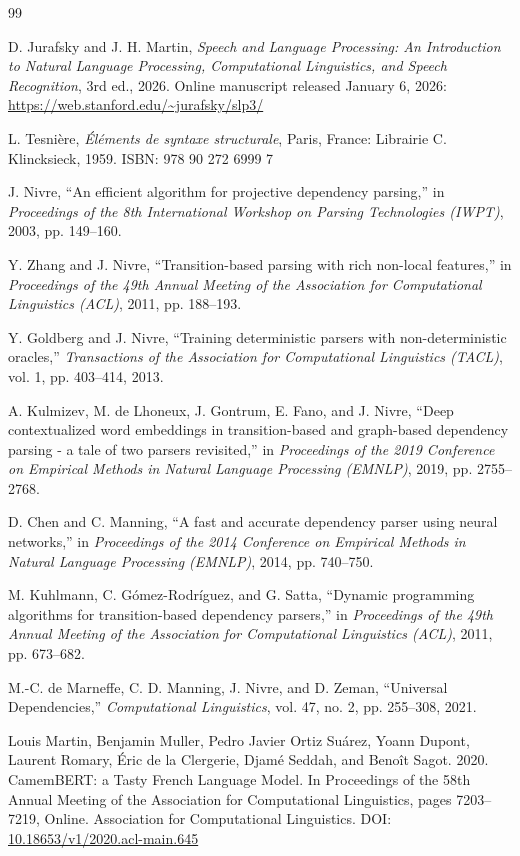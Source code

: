 \documentclass[12pt,a4paper]{article}
\begin{document}
\clearpage
\begin{thebibliography}{99}

D. Jurafsky and J. H. Martin, \emph{Speech and Language Processing: An Introduction to Natural Language Processing, Computational Linguistics, and Speech Recognition}, 3rd ed., 2026. Online manuscript released January 6, 2026: \url{https://web.stanford.edu/~jurafsky/slp3/}

L. Tesnière, \emph{Éléments de syntaxe structurale}, Paris, France: Librairie C. Klincksieck, 1959. ISBN: 978 90 272 6999 7

J. Nivre, ``An efficient algorithm for projective dependency parsing,'' in \emph{Proceedings of the 8th International Workshop on Parsing Technologies (IWPT)}, 2003, pp. 149--160.

Y. Zhang and J. Nivre, ``Transition-based parsing with rich non-local features,'' in \emph{Proceedings of the 49th Annual Meeting of the Association for Computational Linguistics (ACL)}, 2011, pp. 188--193.

Y. Goldberg and J. Nivre, ``Training deterministic parsers with non-deterministic oracles,'' \emph{Transactions of the Association for Computational Linguistics (TACL)}, vol. 1, pp. 403--414, 2013.

A. Kulmizev, M. de Lhoneux, J. Gontrum, E. Fano, and J. Nivre, ``Deep contextualized word embeddings in transition-based and graph-based dependency parsing - a tale of two parsers revisited,'' in \emph{Proceedings of the 2019 Conference on Empirical Methods in Natural Language Processing (EMNLP)}, 2019, pp. 2755--2768.

D. Chen and C. Manning, ``A fast and accurate dependency parser using neural networks,'' in \emph{Proceedings of the 2014 Conference on Empirical Methods in Natural Language Processing (EMNLP)}, 2014, pp. 740--750.

M. Kuhlmann, C. Gómez-Rodríguez, and G. Satta, ``Dynamic programming algorithms for transition-based dependency parsers,'' in \emph{Proceedings of the 49th Annual Meeting of the Association for Computational Linguistics (ACL)}, 2011, pp. 673--682.

M.-C. de Marneffe, C. D. Manning, J. Nivre, and D. Zeman, ``Universal Dependencies,'' \emph{Computational Linguistics}, vol. 47, no. 2, pp. 255--308, 2021.

Louis Martin, Benjamin Muller, Pedro Javier Ortiz Suárez, Yoann Dupont, Laurent Romary, Éric de la Clergerie, Djamé Seddah, and Benoît Sagot. 2020. CamemBERT: a Tasty French Language Model. In Proceedings of the 58th Annual Meeting of the Association for Computational Linguistics, pages 7203–7219, Online. Association for Computational Linguistics. DOI: \url{10.18653/v1/2020.acl-main.645}

\end{thebibliography}
\end{document}
